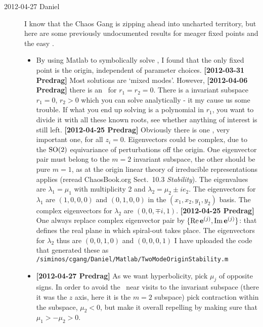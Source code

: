 \begin{description}
\item[2012-04-27 Daniel] I know that the Chaos Gang is zipping ahead into
uncharted territory, but here are some previously undocumented results
for meager fixed points and the easy \reqva.
	\begin{itemize}
		\item By using Matlab to symbolically solve  ,
             I found that the only fixed point is the origin, independent
             of parameter choices.
{\bf [2012-03-31 Predrag]} Most solutions are `mixed modes'. However,
{\bf [2012-04-06 Predrag]}
there is an \eqv\ for $r_1=r_2=0$. There is a invariant subspace $r_1=0$,
$r_2 > 0$ which you can solve analytically - it my cause us some trouble.
If what you end up solving is a polynomial in $r_1$, you want to divide
it with all these known roots, see whether anything of interest is still
left. {\bf [2012-04-25 Predrag]} Obviously there is one \eqv, very
important one, for all $z_i=0$. Eigenvectors could be complex,
due to the $\SOn{2}$ equivariance of perturbations off the origin.
One eigenvector pair must belong to the $m=2$ invariant subspace, the other
should be pure $m=1$, as at the origin linear theory
of irreducible representations applies (reread ChaosBook.org Sect.~10.3
\emph{Stability}).
             The eigenvalues are $\lambda_1 = \mu_1$ with multiplicity 2 and
             $\lambda_2 = \mu_2 \pm i e_2$. The eigenvectors for
             $\lambda_1$ are $(1,0,0,0)$ and $(0,1,0,0)$ in the
             $(x_1,x_2,y_1,y_2)$ basis. The complex eigenvectors for
             $\lambda_2$ are $(0,0,\mp i, 1)$. {\bf [2012-04-25 Predrag]}
             One always replace complex eigenvector pair by  $\{\Re
             \jEigvec[j], \Im \jEigvec[j]\}$: that defines the real plane
             in which spiral-out takes place.
             The eigenvectors for
             $\lambda_2$ thus are $(0,0,1,0)$ and $(0,0,0,1)$
             I have uploaded the code that generated these as
             \texttt{/siminos/cgang/Daniel/Matlab/TwoModeOriginStability.m}
		\item {\bf [2012-04-27 Predrag]} As we want hyperbolicity, pick $\mu_j$
             of opposite signs. In order to avoid the \cLe\ near visits to
             the invariant subspace (there it was the $z$ axis, here it is the
             $m=2$ subspace) pick contraction within the subspace, $\mu_2 < 0$, but
             make it overall repelling by making sure that $\mu_1 > -\mu_2 > 0$.

\end{itemize}
\end{description}
